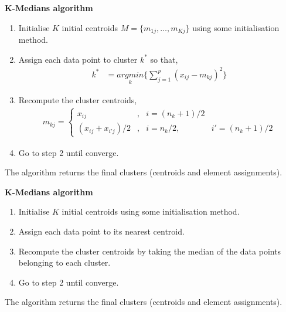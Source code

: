\documentclass[12pt]{article}
\begin{document}
\begin{center}
	\begin{tcolorbox}[breakable,colback=white!100!white,colframe=black!100!black]
		\noindent\textbf{K-Medians algorithm}
		\begin{enumerate}
			\item Initialise $K$ initial centroids $M = \{m_{1j}, \dots, m_{Kj}\}$ using some initialisation method. 
			
			\item Assign each data point to cluster $k^*$ so that,
			\begin{align}\nonumber
			k^* &= \underset{k}{argmin}\bigg\{ \sum_{j=1}^{p} (x_{ij}-m_{kj})^2    \bigg\}
			\end{align}	
			
			\item Recompute the cluster centroids,
			\begin{align}\nonumber
				m_{kj} = 
				\left\{\begin{matrix}
				x_{ij} &, & i = (n_{k}+1)/2 &\\ 
				(x_{ij} + x_{i'j})/2 &, & i = n_{k}/2 ,& i' = (n_{k}+1)/2
				\end{matrix}\right.
			\end{align}	
			
			\item Go to step 2 until converge.		
			
		\end{enumerate}	
		The algorithm returns the final clusters (centroids and element assignments).
	\end{tcolorbox}
\end{center}

\begin{center}
	\begin{tcolorbox}[breakable,colback=white!100!white,colframe=black!100!black]
		\noindent\textbf{K-Medians algorithm}
		\begin{enumerate}
			\item Initialise $K$ initial centroids using some initialisation method. 
			
			\item Assign each data point to its nearest centroid. 
			
			\item Recompute the cluster centroids by taking the median of the data points belonging to each cluster.
			
			\item Go to step 2 until converge.						
			
		\end{enumerate}	
		The algorithm returns the final clusters (centroids and element assignments).
	\end{tcolorbox}
\end{center}
	
\end{document}
